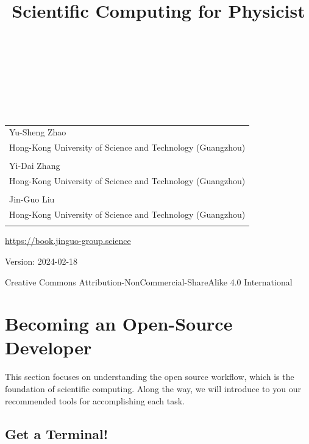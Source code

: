 \documentclass[
  notoc %
]{tufte-book}
\title{Scientific Computing for Physicist}
\author{\noindent{Yu-Sheng Zhao}\\[3mm] \noindent{Yi-Dai
Zhang}\\[3mm] \noindent{Jin-Guo Liu}\\[3mm] }
\date{}
\begin{document}
\makeatletter
\thispagestyle{empty}
\vfill
{\Huge\bf
\noindent
\@title
}\\[1in]
{\Large
\noindent
\@author
}
\makeatother

\makeatletter
\newpage
\thispagestyle{empty}
\vfill
{\noindent
\begin{tabular}{l} Yu-Sheng Zhao\\ Hong-Kong University of Science and Technology (Guangzhou)\\ \\ Yi-Dai Zhang\\ Hong-Kong University of Science and Technology (Guangzhou)\\ \\ Jin-Guo Liu\\ Hong-Kong University of Science and Technology (Guangzhou)\\ \\ \end{tabular}
}
\vfill
{\small
\url{https://book.jinguo-group.science}

Version: 2024-02-18

Creative Commons Attribution-NonCommercial-ShareAlike 4.0 International
}
\makeatother


\frontmatter
\mainmatter
{}

\setcounter{tocdepth}{1}
\tableofcontents

\justifying

\setlength{\parindent}{0pt}

\hypertarget{sec:open-source-dev-toolchains}{%
\chapter{Becoming an Open-Source
Developer}\label{sec:open-source-dev-toolchains}}

This section focuses on understanding the open source workflow, which is
the foundation of scientific computing. Along the way, we will introduce
to you our recommended tools for accomplishing each task.

\hypertarget{get-a-terminal}{%
\section{Get a Terminal!}\label{get-a-terminal}}
\end{document}

